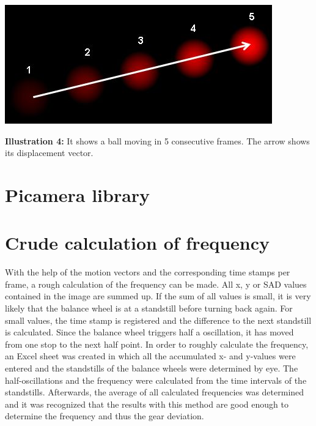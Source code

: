 \documentclass[12pt, a4paper]{report}
\begin{document}
\noindent
\begin{center}
\includegraphics[scale=0.3]{Images/optical_flow_basic1.jpg}

{\bf Illustration 4:}  It shows a ball moving in 5 consecutive frames. The arrow shows its displacement vector.
\end{center}

\bigskip

\section{Picamera library}

\section{Crude calculation of frequency}
With the help of the motion vectors and the corresponding time stamps per frame, a rough calculation of the frequency can be made. All x, y or SAD values contained in the image are summed up. If the sum of all values is small, it is very likely that the balance wheel is at a standstill before turning back again. For small values, the time stamp is registered and the difference to the next standstill is calculated. Since the balance wheel triggers half a oscillation, it has moved from one stop to the next half point. 
In order to roughly calculate the frequency, an Excel sheet was created in which all the accumulated x- and y-values were entered and the standstills of the balance wheels were determined by eye. The half-oscillations and the frequency were calculated from the time intervals of the standstills. Afterwards, the average of all calculated frequencies was determined and it was recognized that the results with this method are good enough to determine the frequency and thus the gear deviation. 
\end{document}
